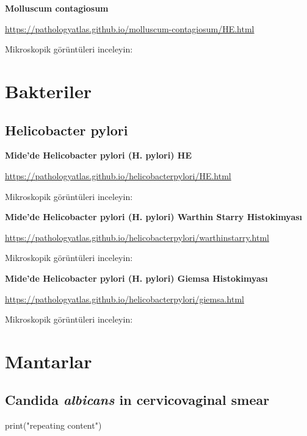 \documentclass[
  letterpaper,
  DIV=11,
  numbers=noendperiod]{scrreprt}
\newenvironment{Shaded}{}{}
\newcommand{\FunctionTok}[1]{\textcolor[rgb]{0.02,0.16,0.49}{#1}}
\newcommand{\NormalTok}[1]{#1}
\newcommand{\StringTok}[1]{\textcolor[rgb]{0.25,0.44,0.63}{#1}}
\begin{document}
\textbf{Molluscum contagiosum}

\url{https://pathologyatlas.github.io/molluscum-contagiosum/HE.html}

Mikroskopik görüntüleri inceleyin:

\hypertarget{bakteriler}{%
\chapter{Bakteriler}\label{bakteriler}}

\hypertarget{helicobacter-pylori}{%
\section{Helicobacter pylori}\label{helicobacter-pylori}}

\textbf{Mide'de Helicobacter pylori (H. pylori) HE}

\url{https://pathologyatlas.github.io/helicobacterpylori/HE.html}

Mikroskopik görüntüleri inceleyin:

\textbf{Mide'de Helicobacter pylori (H. pylori) Warthin Starry
Histokimyası}

\url{https://pathologyatlas.github.io/helicobacterpylori/warthinstarry.html}

Mikroskopik görüntüleri inceleyin:

\textbf{Mide'de Helicobacter pylori (H. pylori) Giemsa Histokimyası}

\url{https://pathologyatlas.github.io/helicobacterpylori/giemsa.html}

Mikroskopik görüntüleri inceleyin:

\hypertarget{mantarlar}{%
\chapter{Mantarlar}\label{mantarlar}}

\hypertarget{candida-albicans-in-cervicovaginal-smear}{%
\section{\texorpdfstring{Candida \emph{albicans} in cervicovaginal
smear}{Candida albicans in cervicovaginal smear}}\label{candida-albicans-in-cervicovaginal-smear}}

\begin{Shaded}
\begin{Highlighting}[]
\FunctionTok{print}\NormalTok{(}\StringTok{"repeating content"}\NormalTok{)}
\end{Highlighting}
\end{Shaded}
\end{document}
